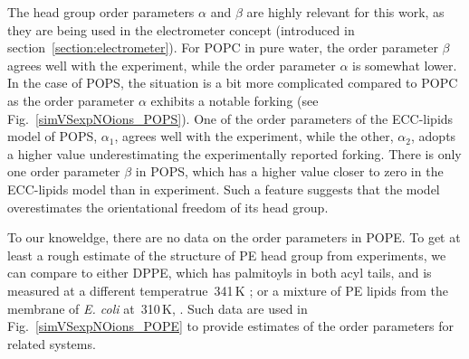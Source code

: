 The head group order parameters $\alpha$ and $\beta$ are highly relevant for this work,
as they are being used in the electrometer concept (introduced in section~\ref{section:electrometer}). 
For POPC in pure water, the order parameter $\beta$ agrees well with the experiment, 
while the order parameter $\alpha$ is somewhat lower. 
In the case of POPS, the situation is a bit more complicated
compared to POPC as the order parameter $\alpha$ exhibits a notable forking (see Fig.~\ref{simVSexpNOions_POPS}).
One of the order parameters of the ECC-lipids model of POPS, $\alpha_1$, agrees well with the experiment, 
while the other, $\alpha_2$, adopts a higher value underestimating the experimentally reported forking. 
There is only one order parameter $\beta$ in POPS, 
which has a higher value closer to zero in the ECC-lipids model than in experiment. 
Such a feature suggests that the model overestimates the orientational freedom of its head group. 

To our knoweldge, there are no data on the order parameters in POPE. 
To get at least a rough estimate of the structure of PE head group from experiments, 
we can compare to either DPPE, which has palmitoyls in both acyl tails, and is measured at a different temperatrue~341\,K \citep{seelig76, seelig80};
or a mixture of PE lipids from the membrane of \emph{E. coli} at~310\,K, \citep{gally81}. 
Such data are used in Fig.~\ref{simVSexpNOions_POPE} to provide estimates of the order parameters for related systems. 
 
 
 
